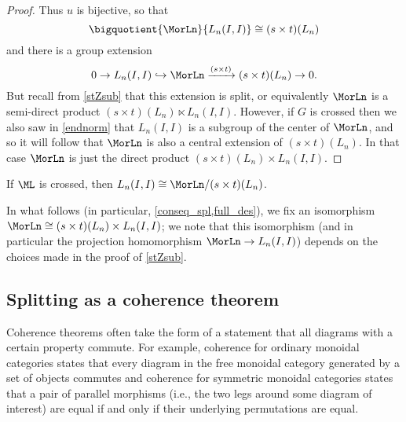 \begin{proof}
Thus $u$ is bijective, so that
  \[
    \bigquotient{\MorLn}{L_n(I,I)} \cong (s \times t)(L_n)
  \]
and there is a group extension
  \[
    0 \rightarrow L_n(I,I) \hookrightarrow \MorLn \xrightarrow{(s \times t)} (s \times t)(L_n) \rightarrow 0.
  \]
But recall from \cref{stZsub} that this extension is split, or equivalently $\MorLn$ is a semi-direct product $(s \times t)(L_n) \ltimes L_n(I,I)$. However, if $G$ is crossed then we also saw in \cref{endnorm} that $L_n(I,I)$ is a subgroup of the center of $\MorLn$, and so it will follow that $\MorLn$ is also a central extension of $(s \times t)(L_n)$. In that case $\MorLn$ is just the direct product $(s \times t)(L_n) \times L_n(I,I)$.
\end{proof}

\begin{cor}\label{lnII_mormodst}
If $\ML$ is crossed, then $L_n(I,I) \cong \MorLn / (s \times t)(L_n)$.
\end{cor}

\begin{conv}
In what follows (in particular, \cref{conseq_spl,full_des}), we fix an isomorphism $\MorLn \cong (s \times t)(L_n) \times L_n(I,I)$; we note that this isomorphism (and in particular the projection homomorphism $\MorLn \rightarrow L_n(I,I)$) depends on the choices made in the proof of \cref{stZsub}.

\end{conv}

\subsection{Splitting as a coherence theorem}\label{splitting_as_coh}

Coherence theorems often take the form of a statement that all diagrams with a certain property commute. For example, coherence for ordinary monoidal categories states that every diagram in the free monoidal category generated by a set of objects commutes and coherence for symmetric monoidal categories states that a pair of parallel morphisms (i.e., the two legs around some diagram of interest) are equal if and only if their underlying permutations are equal.

